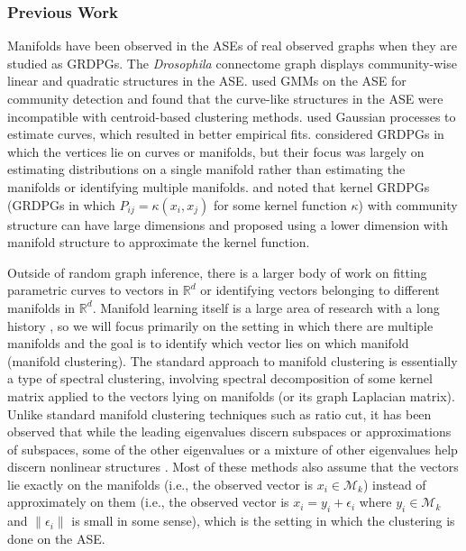 \documentclass[
  12pt,
]{article}
\theoremstyle{definition}
\theoremstyle{definition}
\theoremstyle{definition}
\theoremstyle{definition}
\theoremstyle{remark}
\begin{document}
\hypertarget{previous-work-1}{%
\subsubsection{Previous Work}\label{previous-work-1}}

Manifolds have been observed in the ASEs of real observed graphs when they are studied as GRDPGs.
The \emph{Drosophila} connectome graph \citep{Eichler141762} displays community-wise linear and quadratic structures in the ASE.
\citet{https://doi.org/10.48550/arxiv.1705.03297} used GMMs on the ASE for community detection and found that the curve-like structures in the ASE were incompatible with centroid-based clustering methods.
\citet{SannaPassino2022} used Gaussian processes to estimate curves, which resulted in better empirical fits.
\citet{athreya2020estimation} considered GRDPGs in which the vertices lie on curves or manifolds, but their focus was largely on estimating distributions on a single manifold rather than estimating the manifolds or identifying multiple manifolds.
\citet{https://doi.org/10.48550/arxiv.2006.05168} and \citet{https://doi.org/10.48550/arxiv.2208.11665} noted that kernel GRDPGs (GRDPGs in which \(P_{ij} = \kappa(x_i, x_j)\) for some kernel function \(\kappa\)) with community structure can have large dimensions and proposed using a lower dimension with manifold structure to approximate the kernel function.

Outside of random graph inference, there is a larger body of work on fitting parametric curves to vectors in \(\mathbb{R}^d\) or identifying vectors belonging to different manifolds in \(\mathbb{R}^d\).
Manifold learning itself is a large area of research with a long history \citep{Tenenbaum2000-ff, trosset2020rehabilitating, https://doi.org/10.48550/arxiv.2107.08089}, so we will focus primarily on the setting in which there are multiple manifolds and the goal is to identify which vector lies on which manifold (manifold clustering).
The standard approach to manifold clustering is essentially a type of spectral clustering, involving spectral decomposition of some kernel matrix applied to the vectors lying on manifolds (or its graph Laplacian matrix).
Unlike standard manifold clustering techniques such as ratio cut, it has been observed that while the leading eigenvalues discern subspaces or approximations of subspaces, some of the other eigenvalues or a mixture of other eigenvalues help discern nonlinear structures \citep{10945-32767, https://doi.org/10.48550/arxiv.2208.11665, https://doi.org/10.48550/arxiv.2201.10000}.
Most of these methods also assume that the vectors lie exactly on the manifolds (i.e., the observed vector is \(x_i \in \mathcal{M}_k\)) instead of approximately on them (i.e., the observed vector is \(x_i = y_i + \epsilon_i\) where \(y_i \in \mathcal{M}_k\) and \(\| \epsilon_i \|\) is small in some sense), which is the setting in which the clustering is done on the ASE.
\end{document}
